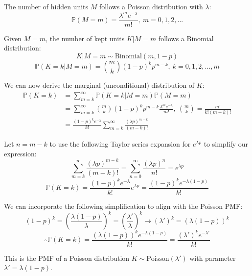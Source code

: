 \documentclass{article}
\begin{document}
{\color{blue}
The number of hidden units $M$ follows a Poisson distribution with $\lambda$:
\begin{equation}
    \mathbb{P}(M=m)= \frac{\lambda ^m e^{-\lambda}}{m!}, \ m=0,1,2,...
\end{equation}

Given $M=m$, the number of kept units $K|M=m$ follows a Binomial distribution:
\begin{equation}
    K|M=m \sim \text{Binomial}(m, 1-p)
\end{equation}
\begin{equation}
    \mathbb{P}(K=k|M=m)= \binom{m}{k}(1-p)^kp^{m-k}, \ k=0,1,2,...,m
\end{equation}

We can now derive the marginal (unconditional) distribution of $K$:
\begin{equation}
\begin{aligned}
    \mathbb{P}(K=k) &= \sum_{m=k}^{\infty} \mathbb{P}(K=k|M=m) \mathbb{P}(M=m)\\
    &= \sum_{m=k}^{\infty} \binom{m}{k}(1-p)^kp^{m-k} \frac{\lambda ^m e^{-\lambda}}{m!}, \ \binom{m}{k}= \frac{m!}{k!(m-k)!}\\
    &= \frac{(1-p)^ke^{-\lambda}}{k!} \sum_{m=k}^{\infty} \frac{(\lambda p)^{m-k}}{(m-k)!}
\end{aligned}
\end{equation}

Let $n=m-k$ to use the following Taylor series expansion for $e^{\lambda p}$ to simplify our expression:
\begin{equation}
    \sum_{m=k}^{\infty} \frac{(\lambda p)^{m-k}}{(m-k)!}= \sum_{n=0}^{\infty} \frac{(\lambda p)^n}{n!}= e^{\lambda p}
\end{equation}
\begin{equation}
    \mathbb{P}(K=k) = \frac{(1-p)^ke^{-\lambda}}{k!}e^{\lambda p}= \frac{(1-p)^ke^{-\lambda(1-p)}}{k!}
\end{equation} 

We can incorporate the following simplification to align with the Poisson PMF:
\begin{equation}
    (1-p)^k= \left(\frac{\lambda (1-p)}{\lambda}\right)^k= \left(\frac{\lambda '}{\lambda}\right)^k \rightarrow (\lambda ') ^k= (\lambda(1-p))^k
\end{equation}
\begin{equation}
    \therefore \mathbb{P}(K=k) = \frac{(\lambda(1-p))^ke^{-\lambda(1-p)}}{k!}= \frac{(\lambda ')^ke^{-\lambda '}}{k!}
\end{equation}

This is the PMF of a Poisson distribution $K \sim \text{Poisson}(\lambda ')$ with parameter $\lambda ' = \lambda(1-p)$.
}
\end{document}
